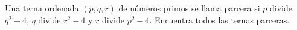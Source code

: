 Una terna ordenada $(p, q, r)$ de números primos se llama parcera si $p$ divide $q^2-4$, $q$ divide $r^2-4$ y $r$ divide $p^2-4$. Encuentra todos las ternas parceras.